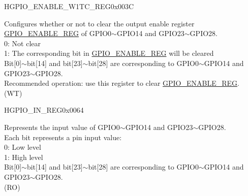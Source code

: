 \begin{register}{H}{GPIO\_ENABLE\_W1TC\_REG}{0x003C}\label{regdesc:GPIOENABLEW1TCREG}
%
\regnewline%
\begin{regdesc}\begin{reglist}
\label{fielddesc:GPIOENABLEW1TC}\item [GPIO\_ENABLE\_W1TC] Configures whether or not to clear the output enable register \hyperref[regdesc:GPIOENABLEREG]{GPIO\_ENABLE\_REG} of GPIO0$\sim$GPIO14 and GPIO23$\sim$GPIO28. \\
0: Not clear\\
1: The corresponding bit in \hyperref[regdesc:GPIOENABLEREG]{GPIO\_ENABLE\_REG} will be cleared\\
Bit[0]$\sim$bit[14] and bit[23]$\sim$bit[28] are corresponding to GPIO0$\sim$GPIO14 and GPIO23$\sim$GPIO28.\\
Recommended operation: use this register to clear \hyperref[regdesc:GPIOENABLEREG]{GPIO\_ENABLE\_REG}.\\ (WT)
\end{reglist}\end{regdesc}
\end{register}


\begin{register}{H}{GPIO\_IN\_REG}{0x0064}\label{regdesc:GPIOINREG}
%
\regnewline%
\begin{regdesc}\begin{reglist}
\label{fielddesc:GPIOINDATANEXT}\item [GPIO\_IN\_DATA\_NEXT] Represents the input value of GPIO0$\sim$GPIO14 and GPIO23$\sim$GPIO28. \\
Each bit represents a pin input value:\\
0: Low level\\
1: High level\\ 
Bit[0]$\sim$bit[14] and bit[23]$\sim$bit[28] are corresponding to GPIO0$\sim$GPIO14 and GPIO23$\sim$GPIO28.\\
(RO)
\end{reglist}\end{regdesc}
\end{register}


